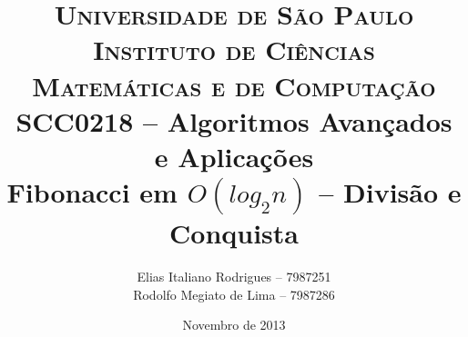 \begin{titlepage}

		\title{
\textsc {\large Universidade de São Paulo\\
Instituto de Ciências Matemáticas e de Computação}\\[1cm]
{\large SCC0218 -- Algoritmos Avançados e Aplicações}\\[5cm]
{\LARGE Fibonacci em $O(log_{2}n)$ -- Divisão e Conquista}\\[4cm]
		}

		\author{
Elias Italiano Rodrigues -- 7987251\\
Rodolfo Megiato de Lima -- 7987286
		}

		\date{
\vfill Novembro de 2013
		}
	
		\maketitle
		\thispagestyle{empty}

\end{titlepage}
